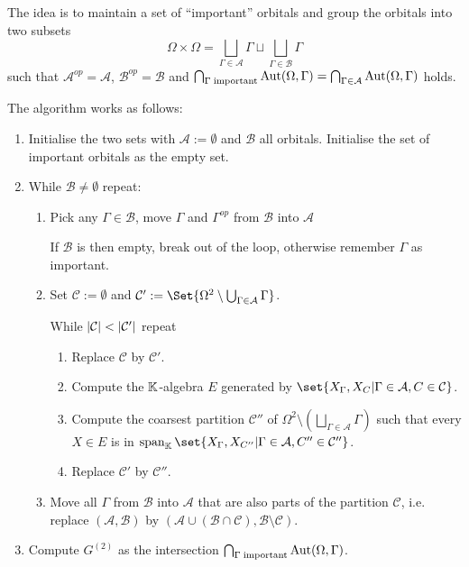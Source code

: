 \documentclass[fontsize=11pt,fleqn,a4paper]{scrartcl}
\begin{document}
\begin{algorithm}
The idea is to maintain a set of \enquote{important} orbitals and group the orbitals into two subsets
\[\Omega\times\Omega = \bigsqcup_{\Gamma\in\mathcal{A}} \Gamma \sqcup \bigsqcup_{\Gamma\in\mathcal{B}} \Gamma\]
such that $\mathcal{A}^{op}=\mathcal{A}$, $\mathcal{B}^{op}=\mathcal{B}$ and $\bigcap_{\Gamma\;\text{important}} \operatorname{Aut}(\Omega,\Gamma) = \bigcap_{\Gamma\in\mathcal{A}} \operatorname{Aut}(\Omega,\Gamma)$ holds.

\medbreak
The algorithm works as follows:
\begin{enumerate}[label=\arabic*.)]
\item Initialise the two sets with $\mathcal{A}:=\emptyset$ and $\mathcal{B}$ all orbitals. Initialise the set of important orbitals as the empty set.

\item While $\mathcal{B}\neq\emptyset$ repeat:
\begin{enumerate}[label=\roman*.)]
\item Pick any $\Gamma\in\mathcal{B}$, move $\Gamma$ and $\Gamma^{op}$ from $\mathcal{B}$ into $\mathcal{A}$

If $\mathcal{B}$ is then empty, break out of the loop, otherwise remember $\Gamma$ as important.

\item Set $\mathcal{C} := \emptyset$ and $\mathcal{C}' := \Set{\Omega^2 \setminus \bigcup_{\Gamma\in\mathcal{A}} \Gamma}$.

While $\lvert\mathcal{C}\rvert<\lvert\mathcal{C}'\rvert$ repeat
	\begin{enumerate}[label=\alph*.)]
	\item Replace $\mathcal{C}$ by $\mathcal{C}'$.
	\item Compute the $\mathbb{K}$-algebra $E$ generated by $\set{X_{\Gamma}, X_C | \Gamma\in\mathcal{A}, C\in\mathcal{C}}$.
	
	\item Compute the coarsest partition $\mathcal{C}''$ of $\Omega^2 \setminus \left(\bigsqcup_{\Gamma\in\mathcal{A}} \Gamma\right)$ such that every $X\in E$ is in $\LinHull_\IK\set{X_{\Gamma}, X_{C''} | \Gamma\in\mathcal{A}, C''\in\mathcal{C}''}$.
	
	\item Replace $\mathcal{C}'$ by $\mathcal{C}''$.
	\end{enumerate}

\item Move all $\Gamma$ from $\mathcal{B}$ into $\mathcal{A}$ that are also parts of the partition $\mathcal{C}$, i.e. replace $(\mathcal{A},\mathcal{B})$ by $(\mathcal{A} \cup (\mathcal{B}\cap\mathcal{C}), \mathcal{B}\setminus\mathcal{C})$.
\end{enumerate}

\item Compute $G^{(2)}$ as the intersection $\bigcap_{\Gamma\;\text{important}} \operatorname{Aut}(\Omega,\Gamma)$.
\end{enumerate}
\end{algorithm}
\end{document}

